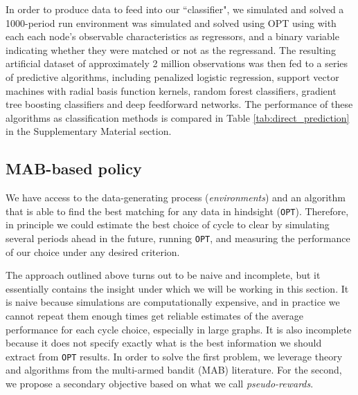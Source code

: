 \documentclass[format=acmsmall, review=false]{acmart}
\begin{document}
In order to produce data to feed into our ``classifier", we simulated and solved a 1000-period run environment was simulated and solved using OPT using with each each node's observable characteristics as regressors, and a binary variable indicating whether they were matched or not as the regressand. The resulting artificial dataset of approximately 2 million observations was then fed to a series of predictive algorithms, including penalized logistic regression\citep{wu2009genome}, support vector machines with radial basis function kernels\citep{cortes1995support}, random forest classifiers\citep{breiman2001random}, gradient tree boosting classifiers\citep{friedman2001greedy} and deep feedforward networks\citep{goodfellow2016deep}. The performance of these algorithms as classification methods is compared in Table \ref{tab:direct_prediction} in the Supplementary Material section.

\subsection{MAB-based policy}

We have access to the data-generating process (\emph{environments}) and an algorithm that is able to find the best matching for any data in hindsight (\texttt{OPT}). Therefore, in principle we could estimate the best choice of cycle to clear by simulating several periods ahead in the future, running \texttt{OPT}, and measuring the performance of our choice under any desired criterion. 

The approach outlined above turns out to be naive and incomplete, but it essentially contains the insight under which we will be working in this section. It is naive because simulations are computationally expensive, and in practice we cannot repeat them enough times get reliable estimates of the average performance for each cycle choice, especially in large graphs. It is also incomplete because it does not specify exactly what is the best information we should extract from \texttt{OPT} results. In order to solve the first problem, we leverage theory and algorithms from the multi-armed bandit (MAB) literature. For the second, we propose a secondary objective based on what we call \emph{pseudo-rewards}.
\end{document}

